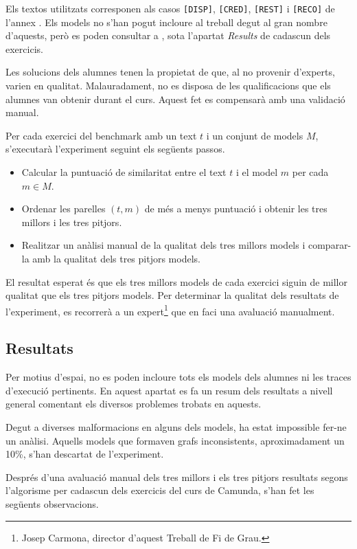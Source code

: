 Els textos utilitzats corresponen als casos \texttt{[DISP]}, \texttt{[CRED]}, \texttt{[REST]} i \texttt{[RECO]} de l'annex . Els models no s'han pogut incloure al treball degut al gran nombre d'aquests, però es poden consultar a \cite{camunda_models}, sota l'apartat \emph{Results} de cadascun dels exercicis.

Les solucions dels alumnes tenen la propietat de que, al no provenir d'experts, varien en qualitat. Malauradament, no es disposa de les qualificacions que els alumnes van obtenir durant el curs. Aquest fet es compensarà amb una validació manual.

Per cada exercici del benchmark amb un text $t$ i un conjunt de models $M$, s'executarà l'experiment seguint els següents passos.

\begin{itemize}
    \item Calcular la puntuació de similaritat entre el text $t$ i el model $m$ per cada $m \in M$.
    \item Ordenar les parelles $(t, m)$ de més a menys puntuació i obtenir les tres millors i les tres pitjors.
    \item Realitzar un anàlisi manual de la qualitat dels tres millors models i comparar-la amb la qualitat dels tres pitjors models.
\end{itemize}

El resultat esperat és que els tres millors models de cada exercici siguin de millor qualitat que els tres pitjors models. Per determinar la qualitat dels resultats de l'experiment, es recorrerà a un expert\footnote{Josep Carmona, director d'aquest Treball de Fi de Grau.} que en faci una avaluació manualment.

\subsection{Resultats}

Per motius d'espai, no es poden incloure tots els models dels alumnes ni les traces d'execució pertinents. En aquest apartat es fa un resum dels resultats a nivell general comentant els diversos problemes trobats en aquests.

Degut a diverses malformacions en alguns dels models, ha estat impossible fer-ne un anàlisi. Aquells models que formaven grafs inconsistents, aproximadament un 10\%, s'han descartat de l'experiment.

Després d'una avaluació manual dels tres millors i els tres pitjors resultats segons l'algorisme per cadascun dels exercicis del curs de Camunda, s'han fet les següents observacions.

